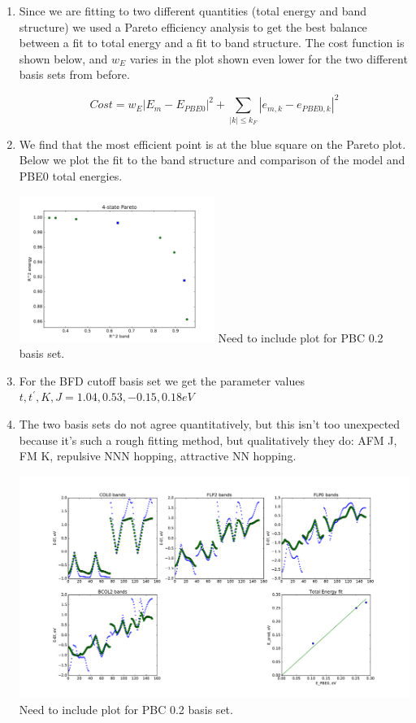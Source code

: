 \documentclass{article}
\begin{document}
\begin{enumerate}
\item Since we are fitting to two different quantities (total energy and band structure) we used a Pareto efficiency analysis to get the best balance between a fit to total energy and a fit to band structure. The cost function is shown below, and $w_E$ varies in the plot shown even lower for the two different basis sets from before.

$$Cost = w_E|E_m - E_{PBE0}|^2 + \sum_{|k|\le k_F} |e_{m,k} - e_{PBE0,k}|^2$$
 
\item We find that the most efficient point is at the blue square on the Pareto plot. Below we plot the fit to the band structure and comparison of the model and PBE0 total energies. 

\includegraphics[width=0.5\textwidth]{../doped_fv/PBE0_8/tb_fit/pareto4.pdf}
\linebreak
\color{red} Need to include plot for PBC 0.2 basis set.

\color{black}

\item For the BFD cutoff basis set we get the parameter values $t,t^\prime,K,J=  1.04, 0.53, -0.15, 0.18 eV$

\item The two basis sets do not agree quantitatively, but this isn't too unexpected because it's such a rough fitting method, but qualitatively they do: AFM J, FM K, repulsive NNN hopping, attractive NN hopping.

\includegraphics[width=\textwidth]{../doped_fv/PBE0_8/tb_fit/pareto4_high.pdf}
\color{red} Need to include plot for PBC 0.2 basis set.
\end{enumerate}
\end{document}
